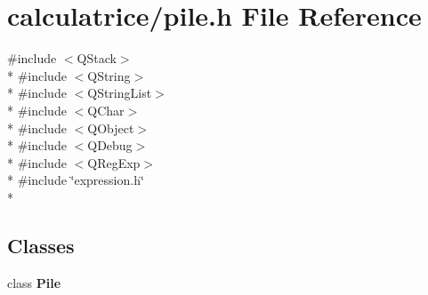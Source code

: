 \section{calculatrice/pile.h File Reference}
\label{pile_8h}
{\ttfamily \#include $<$Q\-Stack$>$}\\*
{\ttfamily \#include $<$Q\-String$>$}\\*
{\ttfamily \#include $<$Q\-String\-List$>$}\\*
{\ttfamily \#include $<$Q\-Char$>$}\\*
{\ttfamily \#include $<$Q\-Object$>$}\\*
{\ttfamily \#include $<$Q\-Debug$>$}\\*
{\ttfamily \#include $<$Q\-Reg\-Exp$>$}\\*
{\ttfamily \#include \char`\"{}expression.\-h\char`\"{}}\\*
\subsection*{Classes}
\begin{DoxyCompactItemize}
\item 
class {\bf Pile}
\end{DoxyCompactItemize}
